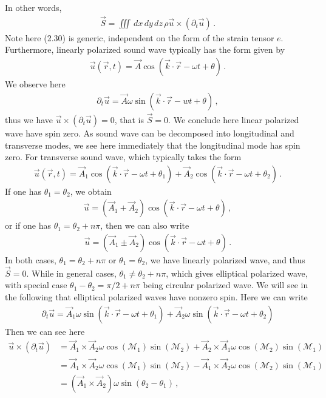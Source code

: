\documentclass[11pt, onesided]{book}
\theoremstyle{break}
\theoremstyle{break}
\newcommand{\pd}{\partial}
\begin{document}
In other words,
\begin{align}
\vec{S} = \iiint \, dx\, dy\, dz \, \rho \vec{u}\times (\pd_t \vec{u})\,.
\end{align}
Note here (2.30) is generic, independent on the form of the strain tensor $e$. Furthermore, linearly polarized sound wave typically has the form given by
\begin{align*}
\vec{u}(\vec{r},t) = \vec{A}\cos(\vec{k}\cdot \vec{r} - \omega t + \theta)\,.
\end{align*}
We observe here
\begin{align*}
\pd_t \vec{u} = \vec{A}\omega \sin(\vec{k}\cdot \vec{r} - w t+\theta)\,,
\end{align*}
thus we have $\vec{u}\times (\pd_t \vec{u}) = 0$, that is $\vec{S} = 0$. We conclude here linear polarized wave have spin zero. As sound wave can be decomposed into longitudinal and transverse modes, we see here immediately that the longitudinal mode has spin zero. For transverse sound wave, which typically takes the form
\begin{align*}
\vec{u}(\vec{r},t) = \vec{A}_1 \cos(\vec{k}\cdot \vec{r} -\omega t + \theta_1) + \vec{A}_2 \cos(\vec{k}\cdot \vec{r} -\omega t + \theta_2)\,.
\end{align*}
If one has $\theta_1 = \theta_2$, we obtain
\begin{align*}
\vec{u} = (\vec{A}_1 + \vec{A}_2)\cos(\vec{k}\cdot \vec{r} - \omega t + \theta)\,,	
\end{align*}
or if one has $\theta_1 = \theta_2 + n\pi$, then we can also write
\begin{align*}
\vec{u} = (\vec{A}_1 \pm \vec{A}_2)\cos(\vec{k}\cdot \vec{r} - \omega t + \theta)\,.
\end{align*}
In both cases, $\theta_1 = \theta_2 + n\pi$ or $\theta_1 = \theta_2$, we have linearly polarized wave, and thus $\vec{S} = 0$. While in general cases, $\theta_1 \neq \theta_2 + n\pi$, which gives elliptical polarized wave, with special case $\theta_1 - \theta_2 = \pi/2 + n\pi$ being circular polarized wave. We will see in the following that elliptical polarized waves have nonzero spin. Here we can write
\begin{align*}
\pd_t \vec{u} = \vec{A}_1 \omega \sin(\vec{k}\cdot \vec{r} -\omega t + \theta_1) + \vec{A}_2 \omega \sin(\vec{k}\cdot \vec{r} - \omega t + \theta_2) 
\end{align*}
Then we can see here
\begin{align*}
\vec{u}\times (\pd_t \vec{u}) 
&= \vec{A}_1\times\vec{A}_2 \omega \cos(\mathcal{M}_1) \sin(\mathcal{M}_2) + \vec{A}_2 \times \vec{A}_1 \omega \cos(\mathcal{M}_2) \sin(\mathcal{M}_1)\\
&=\vec{A}_1\times\vec{A}_2 \omega \cos(\mathcal{M}_1) \sin(\mathcal{M}_2) - \vec{A}_1 \times \vec{A}_2 \omega \cos(\mathcal{M}_2) \sin(\mathcal{M}_1)\\
&= (\vec{A}_1 \times \vec{A}_2) \omega \sin(\theta_2 - \theta_1)\,,
\end{align*}
\end{document}
